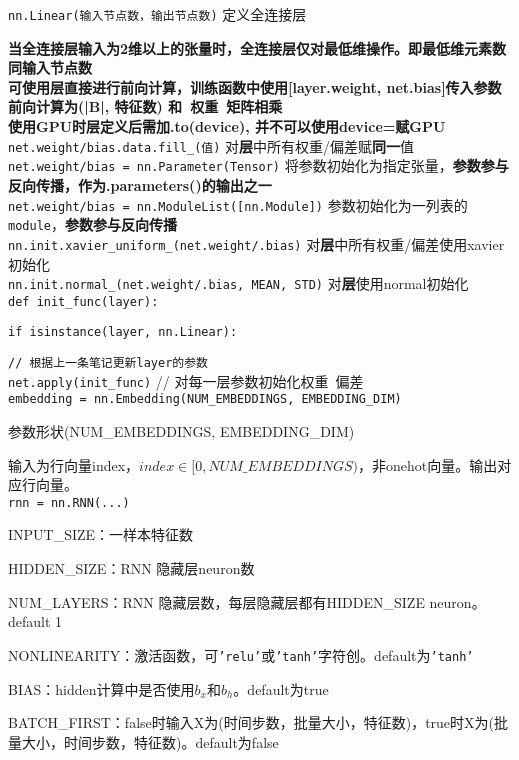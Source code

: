 \documentclass[UTF8]{ctexart}
\begin{document}
  \texttt{nn.Linear(输入节点数，输出节点数)} 定义全连接层
  
  \quad \textbf{当全连接层输入为2维以上的张量时，全连接层仅对最低维操作。即最低维元素数同输入节点数}\\
\textbf{可使用层直接进行前向计算，训练函数中使用[layer.weight, net.bias]传入参数}\\
\textbf{前向计算为(|B|, 特征数) 和\ 权重\ 矩阵相乘}\\
\textbf{使用GPU时层定义后需加.to(device), 并不可以使用device=赋GPU}\\
\texttt{net.weight/bias.data.fill\_(值)} 对\textbf{层}中所有权重/偏差赋\textbf{同一}值\\
\texttt{net.weight/bias = nn.Parameter(Tensor)} 将参数初始化为指定张量，\textbf{参数参与反向传播，作为.parameters()的输出之一}\\
\texttt{net.weight/bias = nn.ModuleList([nn.Module])} 参数初始化为一列表的\texttt{module}，\textbf{参数参与反向传播}\\
\texttt{nn.init.xavier\_uniform\_(net.weight/.bias)} 对\textbf{层}中所有权重/偏差使用xavier初始化\\
\texttt{nn.init.normal\_(net.weight/.bias, MEAN, STD)} 对\textbf{层}使用normal初始化\\
\texttt{def init\_func(layer):}

  \texttt{if isinstance(layer, nn.Linear):}

  \quad \texttt{// 根据上一条笔记更新layer的参数}\\
\texttt{net.apply(init\_func)} // 对每一层参数初始化权重\ 偏差\\
\texttt{embedding = nn.Embedding(NUM\_EMBEDDINGS, EMBEDDING\_DIM)}

  参数形状(NUM\_EMBEDDINGS, EMBEDDING\_DIM)
  
  输入为行向量index，$index \in [0, NUM\_EMBEDDINGS)$，非onehot向量。输出对应行向量。\\
\texttt{rnn = nn.RNN(...)}
  
  INPUT\_SIZE：一样本特征数
  
  HIDDEN\_SIZE：RNN 隐藏层neuron数
  
  NUM\_LAYERS：RNN 隐藏层数，每层隐藏层都有HIDDEN\_SIZE neuron。default 1
  
  NONLINEARITY：激活函数，可\texttt{'relu'}或\texttt{'tanh'}字符创。default为\texttt{'tanh'}

  BIAS：hidden计算中是否使用$b_x$和$b_h$。default为true

  BATCH\_FIRST：false时输入X为(时间步数，批量大小，特征数)，true时X为(批量大小，时间步数，特征数)。default为false
\end{document}
